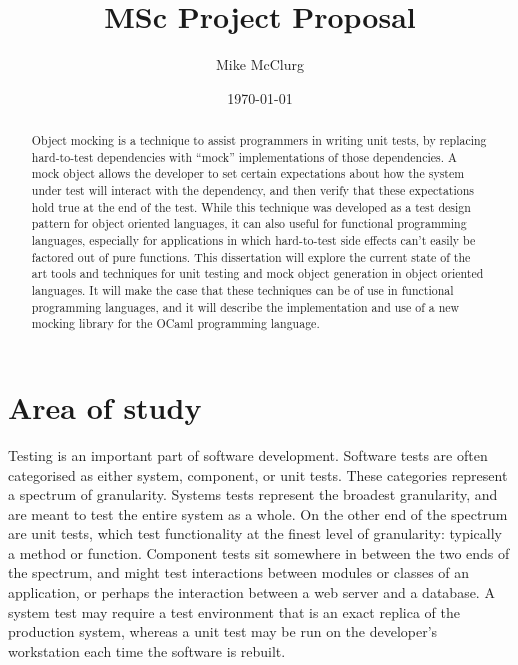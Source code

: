 \documentclass[proposal]{softeng}
\title{MSc Project Proposal}
\author{Mike McClurg}
\date{\today}
\begin{document}
\maketitle

\begin{abstract}


  Object mocking is a technique to assist programmers in writing unit
  tests, by replacing hard-to-test dependencies with ``mock''
  implementations of those dependencies. A mock object allows the
  developer to set certain expectations about how the system under test
  will interact with the dependency, and then verify that these
  expectations hold true at the end of the test. While this technique
  was developed as a test design pattern for object oriented
  languages, it can also useful for functional programming languages,
  especially for applications in which hard-to-test side effects can't
  easily be factored out of pure functions. This dissertation will
  explore the current state of the art tools and techniques for unit
  testing and mock object generation in object oriented languages. It
  will make the case that these techniques can be of use in functional
  programming languages, and it will describe the implementation and
  use of a new mocking library for the OCaml programming language.


\end{abstract}

\section{Area of study}


Testing is an important part of software development. Software tests
are often categorised as either system, component, or unit
tests. These categories represent a spectrum of granularity. Systems
tests represent the broadest granularity, and are meant to test the
entire system as a whole. On the other end of the spectrum are unit
tests, which test functionality at the finest level of granularity:
typically a method or function. Component tests sit somewhere in
between the two ends of the spectrum, and might test interactions
between modules or classes of an application, or perhaps the
interaction between a web server and a database. A system test may
require a test environment that is an exact replica of the production
system, whereas a unit test may be run on the developer's workstation
each time the software is rebuilt.
\end{document}
